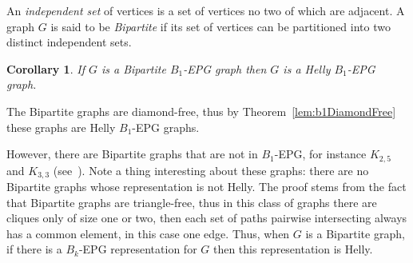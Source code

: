 \documentclass[9pt]{entcs}
\newtheorem{coro}{Corollary}[section]
\begin{document}




An \textit{independent set} of vertices is a set of vertices no two of which are adjacent.
A graph $G$ is said to be \textit{Bipartite} if its set of vertices can be partitioned into two distinct independent sets.



\begin{coro}
If $G$ is a Bipartite $B_1$-EPG graph then $G$ is a Helly $B_1$-EPG graph.
\end{coro}

\begin{pf}
The Bipartite graphs are diamond-free, thus by Theorem~\ref{lem:b1DiamondFree} these graphs are Helly $B_1$-EPG graphs.
\end{pf}

However, there are Bipartite graphs that are not in $B_1$-EPG, for instance $K_{2,5}$ and $K_{3,3}$ (see~\cite{cohen2014}). Note a thing interesting about these graphs: there are no Bipartite graphs whose representation is not Helly. The  proof stems from the fact that Bipartite graphs are triangle-free, thus in this class of graphs there are cliques only of size one or two, then each set of paths pairwise intersecting always has a common element, in this case one edge. Thus, when $G$ is a Bipartite graph, if there is a $B_k$-EPG representation for $G$ then this representation is Helly. 
\end{document}
